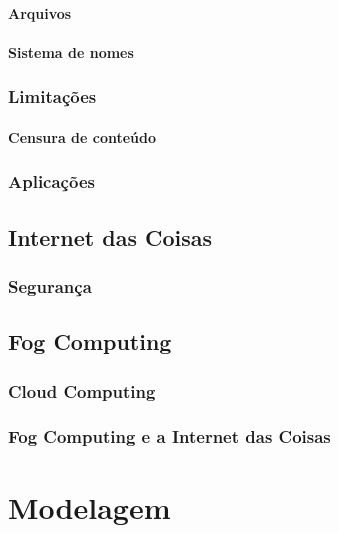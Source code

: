 \documentclass[tcc,capa]{texufpel}
\begin{document}
        \subsubsection{Arquivos}
        
        \subsubsection{Sistema de nomes}
    
    \subsection{Limitações}
    
    	\subsubsection{Censura de conteúdo}
        
    \subsection{Aplicações}

\section{Internet das Coisas}

	\subsection{Segurança}

\section{Fog Computing}

	\subsection{Cloud Computing}
    
    \subsection{Fog Computing e a Internet das Coisas}



\chapter{Modelagem}
\end{document}
